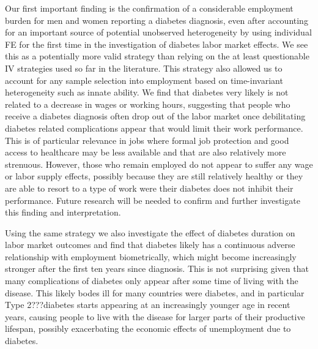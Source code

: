\documentclass[12pt,english,british]{article}
\begin{document}
Our first important finding is the confirmation of a considerable employment burden for men and women reporting a diabetes diagnosis, even after accounting for an important source of potential unobserved heterogeneity by using individual \ac{FE} for the first time in the investigation of diabetes labor market effects. We see this as a potentially more valid strategy than relying on the at least questionable \ac{IV} strategies used so far in the literature. This strategy also allowed us to account for any sample selection into employment based on time-invariant heterogeneity such as innate ability. We find that diabetes very likely is not related to a decrease in wages or working hours, suggesting that people who receive a diabetes diagnosis often drop out of the labor market once debilitating diabetes related complications appear that would limit their work performance. This is of particular relevance in jobs where formal job protection and good access to healthcare may be less available and that are also relatively more strenuous. However, those who remain employed do not appear to suffer any wage or labor supply effects, possibly because they are still relatively healthy or they are able to resort to a type of work were their diabetes does not inhibit their performance. Future research will be needed to confirm and further investigate this finding and interpretation.

Using the same strategy we also investigate the effect of diabetes duration on labor market outcomes and find that diabetes likely has a continuous adverse relationship with employment biometrically, which might become increasingly stronger after the first ten years since diagnosis. This is not surprising given that many complications of diabetes only appear after some time of living with the disease. This likely bodes ill for many countries were diabetes, and in particular Type 2???diabetes starts appearing at an increasingly younger age in recent years, causing people to live with the disease for larger parts of their productive lifespan, possibly exacerbating the economic effects of unemployment due to diabetes. 
\end{document}
